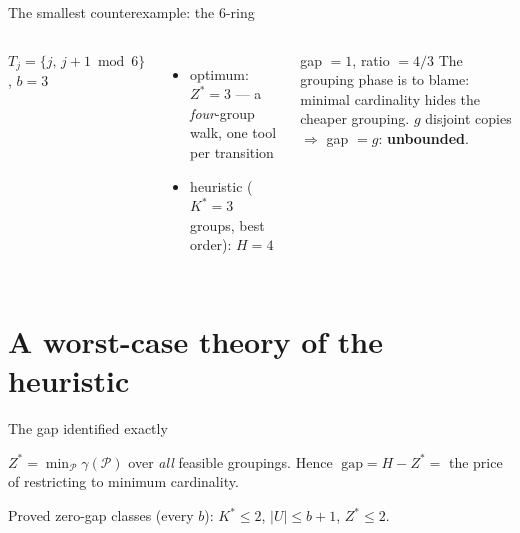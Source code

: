 \documentclass[10pt]{beamer}
\newcommand{\U}{U}\newcommand{\Kst}{K^{\ast}}\newcommand{\Zst}{Z^{\ast}}
\begin{document}
\begin{frame}{The smallest counterexample: the $6$-ring}
\begin{columns}
\centering
{}

{\footnotesize $T_j=\{j,\,j{+}1 \bmod 6\}$, $b=3$}
\begin{itemize}
  \item optimum: $\Zst=3$ --- a \emph{four}-group walk, one tool per transition
  \item heuristic ($\Kst=3$ groups, best order): $H=4$
\end{itemize}
\begin{alertblock}{gap $=1$, \quad ratio $=4/3$}
The grouping phase is to blame: minimal cardinality hides the cheaper
grouping. $g$ disjoint copies $\Rightarrow$ gap $=g$: \textbf{unbounded}.
\end{alertblock}
\end{columns}
\end{frame}

\section{A worst-case theory of the heuristic}
\begin{frame}{The gap identified exactly}
\begin{theorem}
$\displaystyle \Zst=\min_{\mathcal P}\gamma(\mathcal P)$ over \emph{all}
feasible groupings. Hence
$\;\mathrm{gap}=H-\Zst=$ the price of restricting to minimum cardinality.
\end{theorem}
\vspace{1mm}
Proved zero-gap classes (every $b$): \quad
$\Kst\le2$, \quad $|\U|\le b+1$, \quad $\Zst\le2$.
\end{frame}
\end{document}

